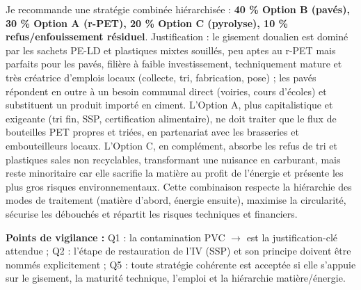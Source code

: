 \documentclass[11pt]{article}
\begin{document}
\begin{corrige}
Je recommande une stratégie combinée hiérarchisée : \textbf{40 \% Option B (pavés), 30 \% Option A (r-PET), 20 \% Option C (pyrolyse), 10 \% refus/enfouissement résiduel}. Justification : le gisement doualien est dominé par les sachets PE-LD et plastiques mixtes souillés, peu aptes au r-PET mais parfaits pour les pavés, filière à faible investissement, techniquement mature et très créatrice d'emplois locaux (collecte, tri, fabrication, pose) ; les pavés répondent en outre à un besoin communal direct (voiries, cours d'écoles) et substituent un produit importé en ciment. L'Option A, plus capitalistique et exigeante (tri fin, SSP, certification alimentaire), ne doit traiter que le flux de bouteilles PET propres et triées, en partenariat avec les brasseries et embouteilleurs locaux. L'Option C, en complément, absorbe les refus de tri et plastiques sales non recyclables, transformant une nuisance en carburant, mais reste minoritaire car elle sacrifie la matière au profit de l'énergie et présente les plus gros risques environnementaux. Cette combinaison respecte la hiérarchie des modes de traitement (matière d'abord, énergie ensuite), maximise la circularité, sécurise les débouchés et répartit les risques techniques et financiers.

\textbf{Points de vigilance :} Q1 : la contamination PVC $\to$  est la justification-clé attendue ; Q2 : l'étape de restauration de l'IV (SSP) et son principe doivent être nommés explicitement ; Q5 : toute stratégie cohérente est acceptée si elle s'appuie sur le gisement, la maturité technique, l'emploi et la hiérarchie matière/énergie.
\end{corrige}
\end{document}
